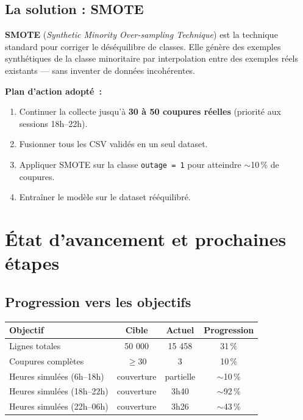 \documentclass[12pt,a4paper]{article}
\begin{document}
\subsection{La solution : SMOTE}

\textbf{SMOTE} (\textit{Synthetic Minority Over-sampling Technique})
est la technique standard pour corriger le déséquilibre de classes.
Elle génère des exemples synthétiques de la classe minoritaire par
interpolation entre des exemples réels existants — sans inventer
de données incohérentes.

\begin{mdframed}[style=ok]
\textbf{Plan d'action adopté~:}
\begin{enumerate}[leftmargin=*, nosep]
  \item Continuer la collecte jusqu'à \textbf{30 à 50 coupures réelles}
    (priorité aux sessions 18h–22h).
  \item Fusionner tous les CSV validés en un seul dataset.
  \item Appliquer SMOTE sur la classe \texttt{outage = 1}
    pour atteindre $\sim$10\,\% de coupures.
  \item Entraîner le modèle sur le dataset rééquilibré.
\end{enumerate}
\end{mdframed}

\section{État d'avancement et prochaines étapes}

\subsection{Progression vers les objectifs}

\begin{center}
\begin{tabular}{lccc}
\toprule
\textbf{Objectif} & \textbf{Cible} & \textbf{Actuel} &
\textbf{Progression} \\
\midrule
Lignes totales       & 50 000  & 15 458 & 31\,\%  \\
Coupures complètes   & $\geq 30$ & 3    & 10\,\%  \\
Heures simulées (6h–18h) & couverture & partielle & $\sim$10\,\% \\
Heures simulées (18h–22h) & couverture & 3h40 & $\sim$92\,\% \\
Heures simulées (22h–06h) & couverture & 3h26 & $\sim$43\,\% \\
\bottomrule
\end{tabular}
\end{center}
\end{document}
